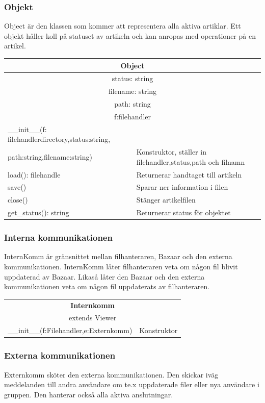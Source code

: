 \subsubsection{Objekt}
Object är den klassen som kommer att representera alla aktiva artiklar. Ett objekt håller koll på statuset av artikeln och kan anropas med operationer på en artikel.

\begin{tabular}{|l|p{10 cm}|}
\hline
\multicolumn{2}{|c|}{\textbf{Object}} \\
\hline
\multicolumn{2}{|c|}{status: string} \\
\multicolumn{2}{|c|}{filename: string} \\
\multicolumn{2}{|c|}{path: string} \\
\multicolumn{2}{|c|}{f:filehandler} \\
\hline
\_\_init\_\_(f: filehandlerdirectory,status:string, &\\
path:string,filename:string) & Konstruktor, ställer in filehandler,status,path och filnamn\\
load(): filehandle & Returnerar handtaget till artikeln \\
save() & Sparar ner information i filen \\
close() & Stänger artikelfilen\\
get\_status(): string & Returnerar status för objektet \\
\hline
\end{tabular}

\subsubsection{Interna kommunikationen}
InternKomm är gränsnittet mellan filhanteraren, Bazaar och den externa kommunikationen. InternKomm låter filhanteraren veta om någon fil blivit uppdaterad av Bazaar. Likaså låter den Bazaar och den externa kommunikationen veta om någon fil uppdaterats av filhanteraren.

\begin{tabular}{|l|p{10 cm}|}
\hline
\multicolumn{2}{|c|}{\textbf{Internkomm}} \\
\multicolumn{2}{|c|}{extends Viewer} \\
\hline
\hline
\_\_init\_\_(f:Filehandler,e:Externkomm) &Konstruktor\\
\hline

\end{tabular}

\subsubsection{Externa kommunikationen}
Externkomm sköter den externa kommunikationen. Den skickar iväg meddelanden till andra användare om te.x uppdaterade filer eller nya användare i gruppen. Den hanterar också alla aktiva anslutningar.

